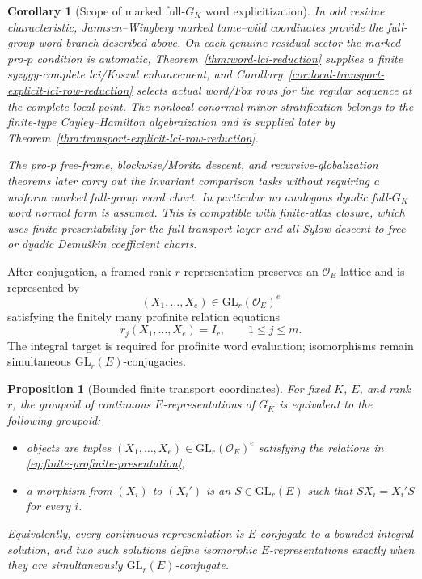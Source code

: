 \documentclass[11pt]{article}
\newtheorem{proposition}[theorem]{Proposition}
\newtheorem{corollary}[theorem]{Corollary}
\theoremstyle{definition}
\begin{document}
\begin{corollary}[Scope of marked full-$G_K$ word explicitization]\label{cor:q2-revised-full-gk-boundary}
In odd residue characteristic, Jannsen--Wingberg marked tame--wild coordinates
provide the full-group word branch described above.  On each genuine residual
sector the marked pro-$p$ condition is automatic, Theorem~\ref{thm:word-lci-reduction}
supplies a finite syzygy-complete lci/Koszul enhancement, and
Corollary~\ref{cor:local-transport-explicit-lci-row-reduction} selects actual
word/Fox rows for the regular sequence at the complete local point.  The
nonlocal conormal-minor stratification belongs to the finite-type
Cayley--Hamilton algebraization and is supplied later by
Theorem~\ref{thm:transport-explicit-lci-row-reduction}.

The pro-$p$ free-frame, blockwise/Morita descent, and recursive-globalization
theorems later carry out the invariant comparison tasks without requiring a
uniform marked full-group word chart.  In particular no analogous dyadic
full-$G_K$ word normal form is assumed.  This is compatible with finite-atlas
closure, which uses finite presentability for the full transport layer and
all-Sylow descent to free or dyadic Demu\v{s}kin coefficient charts.
\end{corollary}

After conjugation, a framed rank-$r$ representation preserves an $\mathcal O_E$-lattice and is represented by
\[
(X_1,\ldots,X_e)\in \mathrm{GL}_r(\mathcal O_E)^e
\]
satisfying the finitely many profinite relation equations
\[
r_j(X_1,\ldots,X_e)=I_r,
\qquad 1\leq j\leq m.
\]
The integral target is required for profinite word evaluation; isomorphisms remain simultaneous $\mathrm{GL}_r(E)$-conjugacies.

\begin{proposition}[Bounded finite transport coordinates]\label{prop:finite-transport-coordinates}
For fixed $K$, $E$, and rank $r$, the groupoid of continuous $E$-representations of $G_K$ is equivalent to the following groupoid:
\begin{itemize}
\item objects are tuples $(X_1,\ldots,X_e)\in\mathrm{GL}_r(\mathcal O_E)^e$ satisfying the relations in \eqref{eq:finite-profinite-presentation};
\item a morphism from $(X_i)$ to $(X_i')$ is an $S\in\mathrm{GL}_r(E)$ such that $SX_i=X_i'S$ for every $i$.
\end{itemize}
Equivalently, every continuous representation is $E$-conjugate to a bounded integral solution, and two such solutions define isomorphic $E$-representations exactly when they are simultaneously $\mathrm{GL}_r(E)$-conjugate.
\end{proposition}
\end{document}
